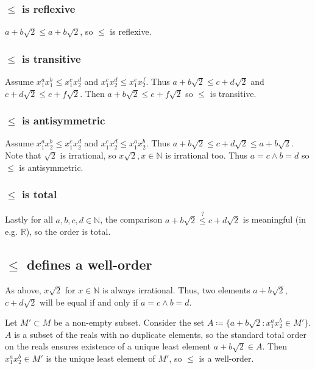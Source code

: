 \documentclass[a4paper]{scrreprt}
\begin{document}
\subsubsection{$\leq$ is reflexive}

$a + b \sqrt{2} \leq a + b \sqrt{2}$, so $\leq$ is reflexive.

\subsubsection{$\leq$ is transitive}

Assume $x_1^a x_1^b \leq x_1^c x_2^d$ and $x_1^c x_2^d \leq x_1^e x_2^f$. Thus
$a + b \sqrt{2} \leq c + d \sqrt{2}$ and $c + d \sqrt{2} \leq e + f \sqrt{2}$.
Then $a + b \sqrt{2} \leq e + f \sqrt{2}$ so $\leq$ is transitive.

\subsubsection{$\leq$ is antisymmetric}

Assume $x_1^a x_2^b \leq x_1^c x_2^d$ and $x_1^c x_2^d \leq x_1^a x_2^b$. Thus
$a + b \sqrt{2} \leq c + d \sqrt{2} \leq a + b \sqrt{2}$. Note that $\sqrt{2}$
is irrational, so $x \sqrt{2}, x \in \mathbb{N}$ is irrational too. Thus $a = c
\land b = d$ so $\leq$ is antisymmetric.

\subsubsection{$\leq$ is total}

Lastly for all $a, b, c, d \in \mathbb{N}$, the comparison $a + b \sqrt{2}
\overset{?}{\leq} c + d \sqrt{2}$ is meaningful (in e.g. $\mathbb{R}$), so the
order is total.

\subsection{$\leq$ defines a well-order}

As above, $x \sqrt{2}$ for $x \in \mathbb{N}$ is always irrational. Thus, two
elements $a + b \sqrt{2}$, $c + d \sqrt{2}$ will be equal if and only if $a = c
\land b = d$.

Let $M' \subset M$ be a non-empty subset. Consider the set $A \coloneqq \{a + b
\sqrt{2} : x_1^a x_2^b \in M'\}$. $A$ is a subset of the reals with no
duplicate elements, so the standard total order on the reals ensures existence
of a unique least element $a + b \sqrt{2} \in A$. Then $x_1^a x_2^b \in M'$
is the unique least element of $M'$, so $\leq$ is a well-order.
\end{document}

